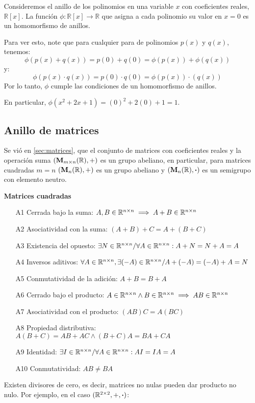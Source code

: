 \begin{fmd-example}
Consideremos el anillo de los polinomios en una variable $x$ con coeficientes reales, $\mathbb{R}[x]$. La función $\phi: \mathbb{R}[x] \to \mathbb{R}$ que asigna a cada polinomio su valor en $x = 0$ es un homomorfismo de anillos.

Para ver esto, note que para cualquier para de polinomios $p(x)$ y $q(x)$, tenemos:
\[
\phi \left(p(x) + q(x)\right) = p(0) + q(0) = \phi(p(x)) + \phi(q(x))
\]
y:
\[
\phi \left(p(x) \cdot q(x)\right) = p(0) \cdot q(0) = \phi \left(p(x)\right) \cdot \left(q(x)\right)
\]
Por lo tanto, $\phi$ cumple las condiciones de un homomorfismo de anillos.

En particular, $\phi(x^2 + 2x + 1) = (0)^2 + 2(0) + 1 = 1$.
\end{fmd-example}

\subsection{Anillo de matrices} \label{sec:matrices2}
Se vió en \ref{sec:matrices}, que el conjunto de matrices con coeficientes reales y la operación suma $(\mathbf{M}_{m \times n}(\mathbb{R}), +)$ es un grupo abeliano, en particular, para matrices cuadradas $m=n$ $(\mathbf{M}_{n}(\mathbb{R}), +)$ es un grupo abeliano y $(\mathbf{M}_{n}(\mathbb{R}), \boldsymbol{\cdot})$ es un semigrupo con elemento neutro.

\textbf{Matrices cuadradas}
\begin{itemize}
	\item[A1] Cerrada bajo la suma: $A, B \in \mathbb{R}^{n \times n} \implies A + B \in \mathbb{R}^{n\times n}$  \cmark
	\item[A2] Asociatividad con la suma: $(A + B) + C = A + (B + C)$ \cmark
	\item[A3] Existencia del opuesto: $ \exists N \in \mathbb{R}^{n \times n} / \forall A \in \mathbb{R}^{n \times n}: A + N = N + A = A $  \cmark
	\item[A4] Inversos aditivos: $ \forall A \in \mathbb{R}^{n \times n}, \exists (-A) \in \mathbb{R}^{n \times n} / A + (-A) = (-A)  + A = N$ \cmark
	\item[A5] Conmutatividad de la adición: $A + B = B + A$ \cmark
	\item[A6] Cerrado bajo el producto: $A \in \mathbb{R}^{n \times n} \land B \in \mathbb{R}^{n \times n} \implies AB \in \mathbb{R}^{n \times n}$  \cmark
	\item[A7] Asociatividad con el producto: $(AB)C = A(BC)$ \cmark
	\item[A8] Propiedad distributiva: $A(B+C) = AB + AC \land (B + C)A = BA + CA$ \cmark 
	\item[A9] Identidad: $\exists I \in \mathbb{R}^{n \times n} / \forall A \in \mathbb{R}^{n \times n}: A I = I A = A $ \cmark
	\item[A10] Conmutatividad: $AB \ne BA$  \xmark
\end{itemize}
Existen divisores de cero, es decir, matrices no nulas pueden dar producto no nulo. Por ejemplo, en el caso $(\mathbb{R}^{2 \times 2}, +, \boldsymbol{\cdot})$:

